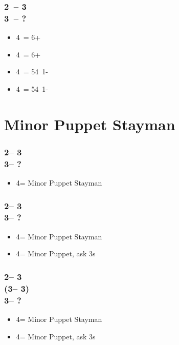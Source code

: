 \documentclass[12pt, a4paper]{report}
\begin{document}
{{        \subsubsection*{2\ntx\ -- 3\spades \\ 3\nt\ -- ?}
        \begin{itemize}
            \item 4\clubs\ = 6+\clubs
            \item 4\diams\ = 6+\diams
            \item 4\hearts\ = 54\minor\ 1-\hearts
            \item 4\spades\ = 54\minor\ 1-\spades
        \end{itemize}
    }

    \section*{\colorbox{blue!30}{Minor Puppet Stayman}}
     {
        \subsubsection*{2\nt -- 3\clubs\\
                    3\diams -- ?}
        \begin{itemize}
            \item 4\clubs = Minor Puppet Stayman
        \end{itemize}

        \subsubsection*{2\nt -- 3\clubs\\
                        3\major -- ?}
        \begin{itemize}
            \item 4\clubs = Minor Puppet Stayman
            \item 4\diams = Minor Puppet, ask 3s
        \end{itemize}

        \subsubsection*{2\nt -- 3\clubs\\
                        (3\diams -- 3\major)\\
                        3\nt -- ?}
        \begin{itemize}
            \item 4\clubs = Minor Puppet Stayman
            \item 4\diams = Minor Puppet, ask 3s
        \end{itemize}

}}
\end{document}
